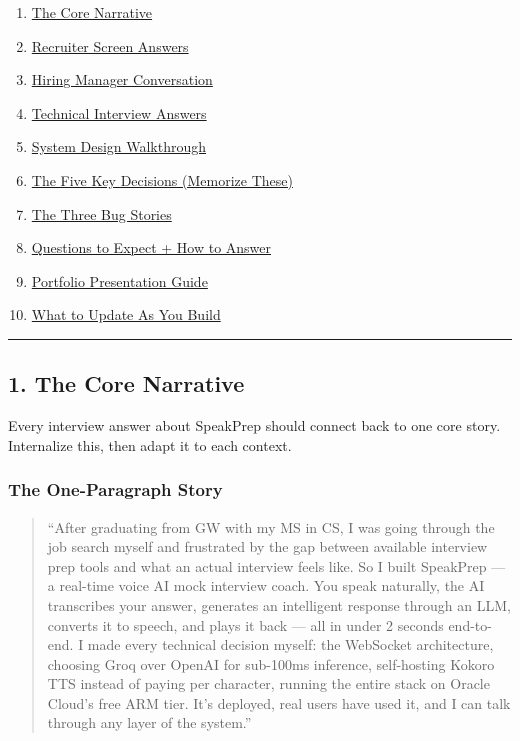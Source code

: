 \documentclass[
  11pt,
]{article}
\providecommand{\tightlist}{%
  \setlength{\itemsep}{0pt}\setlength{\parskip}{0pt}}
\begin{document}
\begin{enumerate}
\def\labelenumi{\arabic{enumi}.}
\tightlist
\item
  \protect\hyperlink{1-the-core-narrative}{The Core Narrative}
\item
  \protect\hyperlink{2-recruiter-screen-answers}{Recruiter Screen
  Answers}
\item
  \protect\hyperlink{3-hiring-manager-conversation}{Hiring Manager
  Conversation}
\item
  \protect\hyperlink{4-technical-interview-answers}{Technical Interview
  Answers}
\item
  \protect\hyperlink{5-system-design-walkthrough}{System Design
  Walkthrough}
\item
  \protect\hyperlink{6-the-five-key-decisions}{The Five Key Decisions
  (Memorize These)}
\item
  \protect\hyperlink{7-the-three-bug-stories}{The Three Bug Stories}
\item
  \protect\hyperlink{8-questions-to-expect--how-to-answer}{Questions to
  Expect + How to Answer}
\item
  \protect\hyperlink{9-portfolio-presentation-guide}{Portfolio
  Presentation Guide}
\item
  \protect\hyperlink{10-what-to-update-as-you-build}{What to Update As
  You Build}
\end{enumerate}

\begin{center}\rule{0.5\linewidth}{0.5pt}\end{center}

\hypertarget{the-core-narrative}{%
\subsection{1. The Core Narrative}\label{the-core-narrative}}

Every interview answer about SpeakPrep should connect back to one core
story. Internalize this, then adapt it to each context.

\hypertarget{the-one-paragraph-story}{%
\subsubsection{The One-Paragraph Story}\label{the-one-paragraph-story}}

\begin{quote}
``After graduating from GW with my MS in CS, I was going through the job
search myself and frustrated by the gap between available interview prep
tools and what an actual interview feels like. So I built SpeakPrep ---
a real-time voice AI mock interview coach. You speak naturally, the AI
transcribes your answer, generates an intelligent response through an
LLM, converts it to speech, and plays it back --- all in under 2 seconds
end-to-end. I made every technical decision myself: the WebSocket
architecture, choosing Groq over OpenAI for sub-100ms inference,
self-hosting Kokoro TTS instead of paying per character, running the
entire stack on Oracle Cloud's free ARM tier. It's deployed, real users
have used it, and I can talk through any layer of the system.''
\end{quote}
\end{document}
